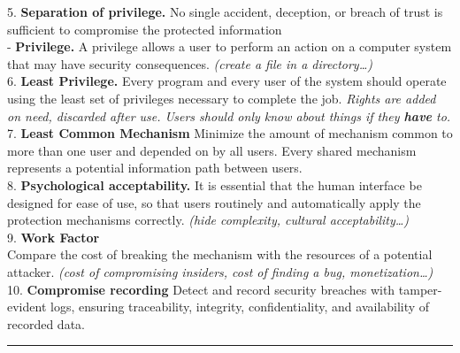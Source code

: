 \documentclass[9pt, a4paper]{extarticle}
\makeatletter
\renewcommand{\hline}{\noalign{\vskip 2px}\hrule\@height\arrayrulewidth\@width\linewidth\noalign{\vskip 2px}}
\makeatother
\begin{document}
\noindent \begin{minipage}[t]{0.495\textwidth}
	5. \textbf{Separation of privilege.}	No single accident, deception, or breach of trust is sufficient to compromise the protected information\\
	- \textbf{Privilege.} A privilege allows a user to perform an action on a computer system that may have security consequences. \textit{(create a file in a directory\dots)}\\
	6. \textbf{Least Privilege.} Every program and every user of the system should operate using the least set of privileges necessary to complete the job. \textit{Rights are added on need, discarded after use. Users should only know about things if they \textbf{have} to.}\\
	7. \textbf{Least Common Mechanism} Minimize the amount of mechanism common to more than one user and depended on by all users. Every shared mechanism represents a potential information path between users.\\
	8. \textbf{Psychological acceptability.}
	It is essential that the human interface be designed for ease of use, so that users routinely and automatically apply the protection mechanisms correctly. \textit{(hide complexity, cultural acceptability\dots)}\\
	9. \textbf{Work Factor}\\
	Compare the cost of breaking the mechanism with the resources of a potential attacker. \textit{(cost of compromising insiders, cost of finding a bug, monetization\dots)}\\
	10. \textbf{Compromise recording} Detect and record security breaches with tamper-evident logs, ensuring traceability, integrity, confidentiality, and availability of recorded data.
\end{minipage}
\hline
\end{document}
